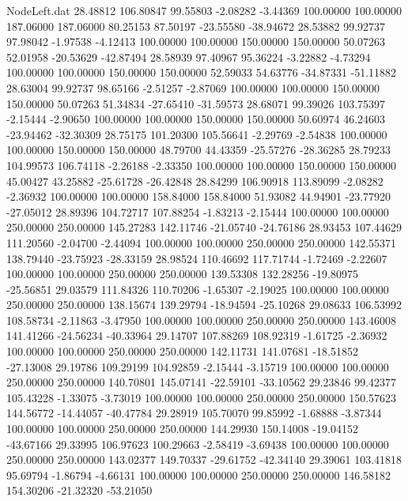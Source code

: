 \begin{filecontents}{NodeLeft.dat}
  28.48812  106.80847   99.55803    -2.08282   -3.44369  100.00000  100.00000  187.06000  187.06000   80.25153   87.50197  -23.55580  -38.94672
  28.53882   99.92737   97.98042    -1.97538   -4.12413  100.00000  100.00000  150.00000  150.00000   50.07263   52.01958  -20.53629  -42.87494
  28.58939   97.40967   95.36224    -3.22882   -4.73294  100.00000  100.00000  150.00000  150.00000   52.59033   54.63776  -34.87331  -51.11882
  28.63004   99.92737   98.65166    -2.51257   -2.87069  100.00000  100.00000  150.00000  150.00000   50.07263   51.34834  -27.65410  -31.59573
  28.68071   99.39026  103.75397    -2.15444   -2.90650  100.00000  100.00000  150.00000  150.00000   50.60974   46.24603  -23.94462  -32.30309
  28.75175  101.20300  105.56641    -2.29769   -2.54838  100.00000  100.00000  150.00000  150.00000   48.79700   44.43359  -25.57276  -28.36285
  28.79233  104.99573  106.74118    -2.26188   -2.33350  100.00000  100.00000  150.00000  150.00000   45.00427   43.25882  -25.61728  -26.42848
  28.84299  106.90918  113.89099    -2.08282   -2.36932  100.00000  100.00000  158.84000  158.84000   51.93082   44.94901  -23.77920  -27.05012
  28.89396  104.72717  107.88254    -1.83213   -2.15444  100.00000  100.00000  250.00000  250.00000  145.27283  142.11746  -21.05740  -24.76186
  28.93453  107.44629  111.20560    -2.04700   -2.44094  100.00000  100.00000  250.00000  250.00000  142.55371  138.79440  -23.75923  -28.33159
  28.98524  110.46692  117.71744    -1.72469   -2.22607  100.00000  100.00000  250.00000  250.00000  139.53308  132.28256  -19.80975  -25.56851
  29.03579  111.84326  110.70206    -1.65307   -2.19025  100.00000  100.00000  250.00000  250.00000  138.15674  139.29794  -18.94594  -25.10268
  29.08633  106.53992  108.58734    -2.11863   -3.47950  100.00000  100.00000  250.00000  250.00000  143.46008  141.41266  -24.56234  -40.33964
  29.14707  107.88269  108.92319    -1.61725   -2.36932  100.00000  100.00000  250.00000  250.00000  142.11731  141.07681  -18.51852  -27.13008
  29.19786  109.29199  104.92859    -2.15444   -3.15719  100.00000  100.00000  250.00000  250.00000  140.70801  145.07141  -22.59101  -33.10562
  29.23846   99.42377  105.43228    -1.33075   -3.73019  100.00000  100.00000  250.00000  250.00000  150.57623  144.56772  -14.44057  -40.47784
  29.28919  105.70070   99.85992    -1.68888   -3.87344  100.00000  100.00000  250.00000  250.00000  144.29930  150.14008  -19.04152  -43.67166
  29.33995  106.97623  100.29663    -2.58419   -3.69438  100.00000  100.00000  250.00000  250.00000  143.02377  149.70337  -29.61752  -42.34140
  29.39061  103.41818   95.69794    -1.86794   -4.66131  100.00000  100.00000  250.00000  250.00000  146.58182  154.30206  -21.32320  -53.21050

\end{filecontents}
